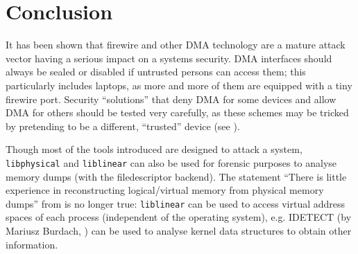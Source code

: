%
%

\section{Conclusion}

\label{conclusion}

It has been shown that firewire and other DMA technology are a mature attack
vector having a serious impact on a systems security. DMA interfaces should
always be sealed or disabled if untrusted persons can access them; this
particularly includes laptops, as more and more of them are equipped with a tiny
firewire port.  Security ``solutions'' that deny DMA for some devices and allow
DMA for others should be tested very carefully, as these schemes may be tricked
by pretending to be a different, ``trusted'' device (see
\cite{rux2k6firewire:2006}).

Though most of the tools introduced are designed to attack a system, \linebreak
\texttt{libphysical} and \texttt{liblinear} can also be used for forensic
purposes to analyse memory dumps (with the filedescriptor backend). The
statement ``There is little experience in reconstructing logical/virtual memory
from physical memory dumps'' from \cite{cansecwest_firewire:2005} is no longer
true: \texttt{liblinear} can be used to access virtual address spaces of each
process (independent of the operating system), e.g\@. IDETECT (by Mariusz
Burdach, \cite{finding_digital_evidence_in_physical_memory:2006}) can be used to
analyse kernel data structures to obtain other information.

